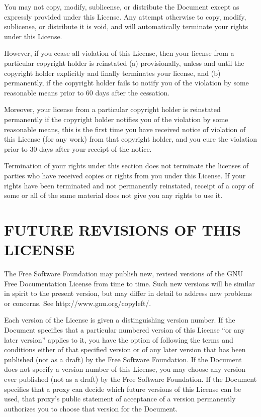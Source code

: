 You may not copy, modify, sublicense, or distribute the Document
except as expressly provided under this License.  Any attempt
otherwise to copy, modify, sublicense, or distribute it is void, and
will automatically terminate your rights under this License.

However, if you cease all violation of this License, then your license
from a particular copyright holder is reinstated (a) provisionally,
unless and until the copyright holder explicitly and finally
terminates your license, and (b) permanently, if the copyright holder
fails to notify you of the violation by some reasonable means prior to
60 days after the cessation.

Moreover, your license from a particular copyright holder is
reinstated permanently if the copyright holder notifies you of the
violation by some reasonable means, this is the first time you have
received notice of violation of this License (for any work) from that
copyright holder, and you cure the violation prior to 30 days after
your receipt of the notice.

Termination of your rights under this section does not terminate the
licenses of parties who have received copies or rights from you under
this License.  If your rights have been terminated and not permanently
reinstated, receipt of a copy of some or all of the same material does
not give you any rights to use it.


\section{FUTURE REVISIONS OF THIS LICENSE}

The Free Software Foundation may publish new, revised versions
of the GNU Free Documentation License from time to time.  Such new
versions will be similar in spirit to the present version, but may
differ in detail to address new problems or concerns.  See
http://www.gnu.org/copyleft/.

Each version of the License is given a distinguishing version number.
If the Document specifies that a particular numbered version of this
License ``or any later version'' applies to it, you have the option of
following the terms and conditions either of that specified version or
of any later version that has been published (not as a draft) by the
Free Software Foundation.  If the Document does not specify a version
number of this License, you may choose any version ever published (not
as a draft) by the Free Software Foundation.  If the Document
specifies that a proxy can decide which future versions of this
License can be used, that proxy's public statement of acceptance of a
version permanently authorizes you to choose that version for the
Document.



